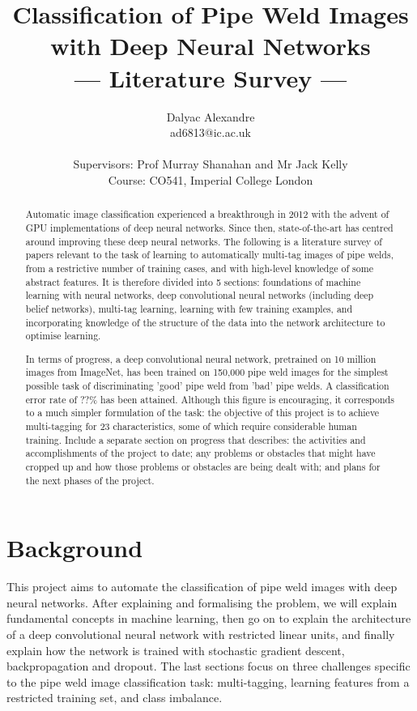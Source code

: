 \documentclass[a4paper,11pt]{article}
\title{Classification of Pipe Weld Images with Deep Neural Networks\\\Large{--- Literature Survey ---}}
\author{Dalyac Alexandre\\
       ad6813@ic.ac.uk\\ \\
       \small{Supervisors: Prof Murray Shanahan and Mr Jack Kelly}\\
       \small{Course: CO541, Imperial College London}
}
\begin{document}
\maketitle

\begin{abstract}

\abstract
{
\par Automatic image classification experienced a breakthrough in 2012 with the advent of GPU implementations of deep neural networks. Since then, state-of-the-art has centred around improving these deep neural networks. The following is a literature survey of papers relevant to the task of learning to automatically multi-tag images of pipe welds, from a restrictive number of training cases, and with high-level knowledge of some abstract features. It is therefore divided into 5 sections: foundations of machine learning with neural networks, deep convolutional neural networks (including deep belief networks), multi-tag learning, learning with few training examples, and incorporating knowledge of the structure of the data into the network architecture to optimise learning.\\

\par In terms of progress, a deep convolutional neural network, pretrained on 10 million images from ImageNet, has been trained on 150,000 pipe weld images for the simplest possible task of discriminating 'good' pipe weld from 'bad' pipe welds. A classification error rate of ??\% has been attained. Although this figure is encouraging, it corresponds to a much simpler formulation of the task: the objective of this project is to achieve multi-tagging for 23 characteristics, some of which require considerable human training.  Include a separate section on progress that describes: the activities and accomplishments of the project to date; any problems or obstacles that might have cropped up and how those problems or obstacles are being dealt with; and plans for the next phases of the project.
}
\end{abstract}

\clearpage
\tableofcontents

\clearpage
\section{Background}

This project aims to automate the classification of pipe weld images with deep neural networks. After explaining and formalising the problem, we will explain fundamental concepts in machine learning, then go on to explain the architecture of a deep convolutional neural network with restricted linear units, and finally explain how the network is trained with stochastic gradient descent, backpropagation and dropout. The last sections focus on three challenges specific to the pipe weld image classification task: multi-tagging, learning features from a restricted training set, and class imbalance.
\end{document}

